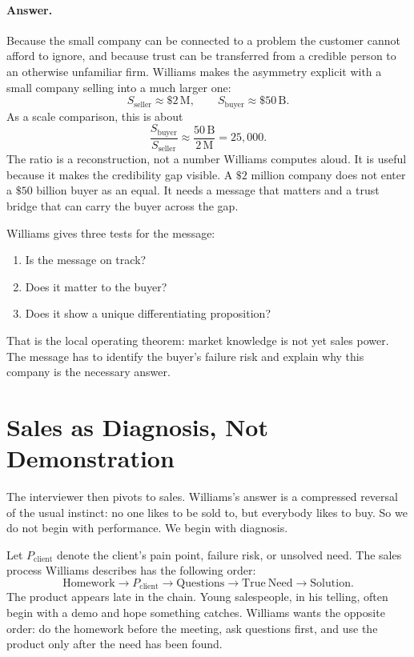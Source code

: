 \paragraph{Answer.} Because the small company can be connected to a problem the customer cannot afford to ignore, and because trust can be transferred from a credible person to an otherwise unfamiliar firm. Williams makes the asymmetry explicit with a small company selling into a much larger one:
\begin{equation}
S_{\mathrm{seller}} \approx \$2\,\mathrm{M},
\qquad
S_{\mathrm{buyer}} \approx \$50\,\mathrm{B}.
\end{equation}
As a scale comparison, this is about
\begin{equation}
\frac{S_{\mathrm{buyer}}}{S_{\mathrm{seller}}}
\approx
\frac{50\,\mathrm{B}}{2\,\mathrm{M}}
=
25{,}000.
\end{equation}
The ratio is a reconstruction, not a number Williams computes aloud. It is useful because it makes the credibility gap visible. A \(\$2\) million company does not enter a \(\$50\) billion buyer as an equal. It needs a message that matters and a trust bridge that can carry the buyer across the gap.

Williams gives three tests for the message:
\begin{enumerate}
\item Is the message on track?
\item Does it matter to the buyer?
\item Does it show a unique differentiating proposition?
\end{enumerate}
That is the local operating theorem: market knowledge is not yet sales power. The message has to identify the buyer's failure risk and explain why this company is the necessary answer.

\section{Sales as Diagnosis, Not Demonstration}

The interviewer then pivots to sales. Williams's answer is a compressed reversal of the usual instinct: no one likes to be sold to, but everybody likes to buy. So we do not begin with performance. We begin with diagnosis.

Let \(P_{\mathrm{client}}\) denote the client's pain point, failure risk, or unsolved need. The sales process Williams describes has the following order:
\begin{equation}
\mathrm{Homework}
\longrightarrow
P_{\mathrm{client}}
\longrightarrow
\mathrm{Questions}
\longrightarrow
\mathrm{True\ Need}
\longrightarrow
\mathrm{Solution}.
\end{equation}
The product appears late in the chain. Young salespeople, in his telling, often begin with a demo and hope something catches. Williams wants the opposite order: do the homework before the meeting, ask questions first, and use the product only after the need has been found.

